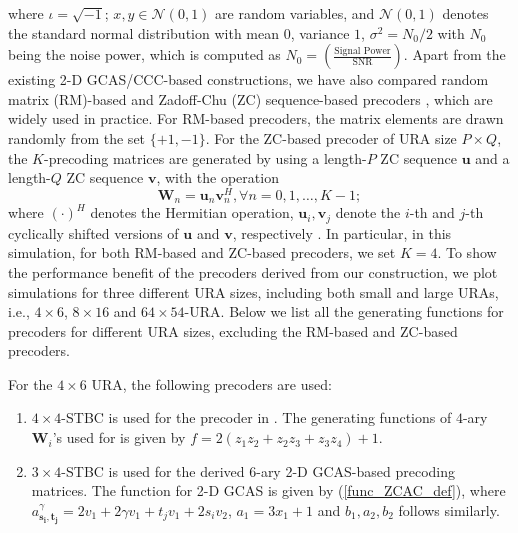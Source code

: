 \documentclass[pdflatex,sn-mathphys-num]{sn-jnl}%
\theoremstyle{thmstyleone}
\begin{document}
	where $\iota=\sqrt{-1}$; $x, y \in \mathcal{N} (0,1)$ are random variables, and $\mathcal{N} (0,1)$ denotes the standard normal distribution with mean $0$, variance $1$, $\sigma^2= N_0/2$  with $N_0$ being the noise power, which is computed as $N_0= \left(  \frac{\text{Signal Power}}{\text{SNR}} \right)$. Apart from the existing 2-D GCAS/CCC-based constructions, we have also compared random matrix (RM)-based and Zadoff-Chu (ZC) sequence-based precoders \cite{Chu1972,SchroederZC}, which are widely used in practice. For RM-based precoders, the matrix elements are drawn randomly from the set $\{+1, -1\}$. For the ZC-based precoder of URA size $P \times Q$, the $K$-precoding matrices are generated by using a length-$P$ ZC sequence $\mathbf{u}$ and a length-$Q$ ZC sequence $\mathbf{v}$, with the operation
	\begin{equation}
		\mathbf{W}_n= \mathbf{u}_n \mathbf{v}_n^H, \forall n= 0,1, \dots, K-1;
	\end{equation}
	where $(\cdot)^H$ denotes the Hermitian operation, $\mathbf{u}_i, \mathbf{v}_j$ denote the $i$-th and $j$-th cyclically shifted versions of $\mathbf{u}$ and $\mathbf{v}$, respectively \cite{Omni2}. In particular, in this simulation, for both RM-based and ZC-based precoders, we set $K=4$.
	To show the performance benefit of the precoders derived from our construction, we plot simulations for three different URA sizes, including both small and large URAs, i.e., $4 \times 6$, $8 \times 16$ and $64 \times 54$-URA. Below we list all the generating functions for precoders for different URA sizes, excluding the RM-based and ZC-based precoders.
	
	For the $4 \times 6$ URA, the following precoders are used:
	\begin{enumerate}	
		\item $4\times4$-STBC is used for the precoder in \cite{ZilongLiuOmni2024}. The generating functions of $4$-ary  $\mathbf{W}_i$'s used for \cite{ZilongLiuOmni2024} is given by $f= 2 (z_1 z_2 + z_2 z_3 + z_3 z_4)+1$.
		
		\item $3\times4$-STBC is used for the derived $6$-ary 2-D GCAS-based precoding matrices. The function for 2-D GCAS is given by (\ref{func_ZCAC_def}), where $a_{\mathbf{s_i},\mathbf{t_j}}^\gamma= 2 v_1 + 2 \gamma v_1 + t_j  v_1+  2 s_i  v_2 $, $a_1= 3 x_1 + 1$ and $b_1, a_2, b_2$ follows similarly.
	\end{enumerate}
	
\end{document}
